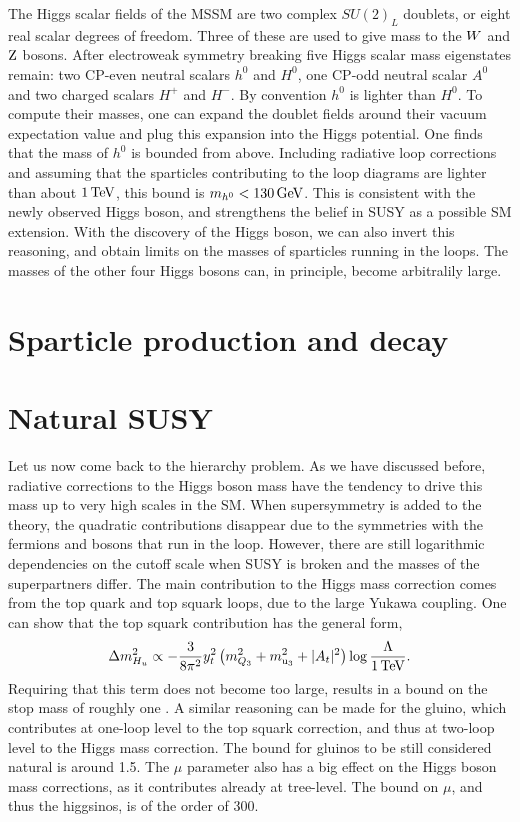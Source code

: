 The Higgs scalar fields of the MSSM are two complex $SU(2)_L$ doublets, or eight real scalar degrees
of freedom. 
Three of these are used to give mass to the $W$ and $\mathrm{Z}$ bosons. 
After electroweak symmetry breaking five Higgs scalar mass eigenstates remain: two CP-even neutral
scalars $h^0$ and $H^0$, one CP-odd neutral scalar $A^0$ and two charged scalars $H^+$ and $H^-$. By
convention $h^0$ is lighter than $H^0$. 
To compute their masses, one can expand the doublet fields around their vacuum expectation value and
plug this expansion into the Higgs potential. One finds that the mass of $h^0$ is bounded from
above. Including radiative loop corrections and assuming that the sparticles contributing to the
loop diagrams are lighter than about $1\,\text{Te\hspace{-.08em}V}$, this bound is $m_{h^0} < 130\,\text{Ge\hspace{-.08em}V}$. This is
consistent with the newly observed Higgs boson, and strengthens the belief in SUSY as a
possible SM extension. With the discovery of the Higgs boson, we can also invert this reasoning, and
obtain limits on the masses of sparticles running in the loops.  
The masses of the other four Higgs bosons can, in principle, become arbitralily large. 


\section{Sparticle production and decay \label{sec:susy_sparticles}}


\section{Natural SUSY \label{sec:susy_natural_susy}}

Let us now come back to the hierarchy problem. As we have discussed before, radiative corrections
to the Higgs boson mass have the tendency to drive this mass up to very high scales in the SM. When
 supersymmetry is added to the theory, the quadratic contributions disappear due to the symmetries
with the fermions and bosons that run in the loop. However, there are still logarithmic dependencies
on the cutoff scale when SUSY is broken and the masses of the superpartners differ. 
The main contribution to the Higgs mass correction comes from the top quark and top squark loops,
due to the large Yukawa coupling. One can show that the top squark contribution has the general
form,
\begin{equation}
  \Delta m_{H_u}^2 \propto - \frac{3}{8\pi^2} y^2_t \left( m^2_{Q_3} + m^2_{\mathrm{u}_3} + |A_t|^2 
  \right) \log \frac{\Lambda}{1\,\text{Te\hspace{-.08em}V}} .
\end{equation}
Requiring that this term does not become too large, results in a bound on the stop mass of roughly
one \TeV. A similar reasoning can be made for the gluino, which contributes at one-loop level to the
top squark correction, and thus at two-loop level to the Higgs mass correction. The bound for
gluinos to be still considered natural is around 1.5\TeV. 
The $\mu$ parameter also has a big effect on the Higgs boson mass corrections, as it contributes
already at tree-level. The bound on $\mu$, and thus the higgsinos, is of the order of 300\GeV. 

